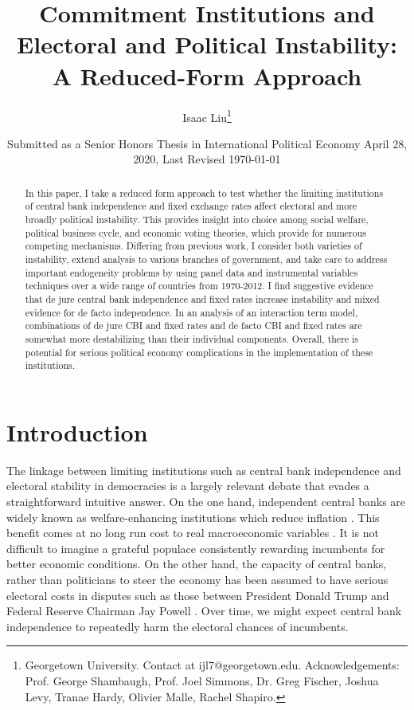 \documentclass{article}
\title{Commitment Institutions and Electoral and Political Instability: A Reduced-Form Approach}
\author{Isaac Liu\thanks{Georgetown University. Contact at ijl7@georgetown.edu. Acknowledgements: Prof. George Shambaugh, Prof. Joel Simmons, Dr. Greg Fischer, Joshua Levy, Tranae Hardy, Olivier Malle, Rachel Shapiro.}}
\date{Submitted as a Senior Honors Thesis in International Political Economy April 28, 2020, \newline Last Revised \today}
\begin{document}
	\maketitle

    \begin{abstract}
        In this paper, I take a reduced form approach to test whether the limiting institutions of central bank independence and fixed exchange rates affect electoral and more broadly political instability. This provides insight into choice among social welfare, political business cycle, and economic voting theories, which provide for numerous competing mechanisms. Differing from previous work, I consider both varieties of instability, extend analysis to various branches of government, and take care to address important endogeneity problems by using panel data and instrumental variables techniques over a wide range of countries from 1970-2012. I find suggestive evidence that de jure central bank independence and fixed rates increase instability  and mixed evidence for de facto independence. In an analysis of an interaction term model, combinations of de jure CBI and fixed rates and de facto CBI and fixed rates are somewhat more destabilizing than their individual components. Overall, there is potential for serious political economy complications in the implementation of these institutions.
    \end{abstract}

    \clearpage
    \newpage

    \section*{Introduction}

    The linkage between limiting institutions such as central bank independence and electoral stability in democracies is a largely relevant debate that evades a straightforward intuitive answer. On the one hand, independent central banks are widely known as welfare-enhancing institutions which reduce inflation \citep{chicago_booth_initiative_on_global_markets_fed_2019}. This benefit comes at no long run cost to real macroeconomic variables \citep{alesina_political_1997}. It is not difficult to imagine a grateful populace consistently rewarding incumbents for better economic conditions. On the other hand, the capacity of central banks, rather than politicians to steer the economy has been assumed to have serious electoral costs in disputes such as those between President Donald Trump and Federal Reserve Chairman Jay Powell \citep{long_federal_2019}. Over time, we might expect central bank independence to repeatedly harm the electoral chances of incumbents.
\end{document}
